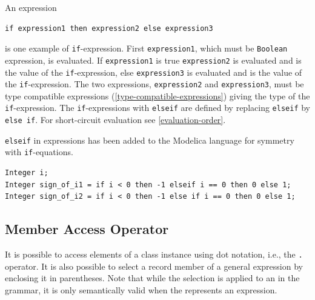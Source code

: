An expression
\begin{lstlisting}[language=modelica]
if expression1 then expression2 else expression3
\end{lstlisting}%
 is one example of \lstinline!if!-expression.
First \lstinline!expression1!, which must be \lstinline!Boolean! expression, is evaluated.
If \lstinline!expression1! is true \lstinline!expression2! is evaluated and is the value of the \lstinline!if!-expression, else \lstinline!expression3! is evaluated and is the value of the \lstinline!if!-expression.
The two expressions, \lstinline!expression2! and \lstinline!expression3!, must be type compatible expressions (\cref{type-compatible-expressions}) giving the type of the \lstinline!if!-expression.
The \lstinline!if!-expressions with \lstinline!elseif! are defined by replacing \lstinline!elseif! by \lstinline!else if!.
For short-circuit evaluation see \cref{evaluation-order}.

\begin{nonnormative}
\lstinline!elseif! in expressions has been added to the Modelica language for symmetry with \lstinline!if!-equations.
\end{nonnormative}

\begin{example}
\begin{lstlisting}[language=modelica]
Integer i;
Integer sign_of_i1 = if i < 0 then -1 elseif i == 0 then 0 else 1;
Integer sign_of_i2 = if i < 0 then -1 else if i == 0 then 0 else 1;
\end{lstlisting}
\end{example}

\subsection{Member Access Operator}\label{member-access-operator}

It is possible to access elements of a class instance using dot notation, i.e., the \lstinline!.! operator.
It is also possible to select a record member of a general expression by enclosing it in parentheses.
Note that while the selection is applied to an  in the grammar, it is only semantically valid when the  represents an expression.

